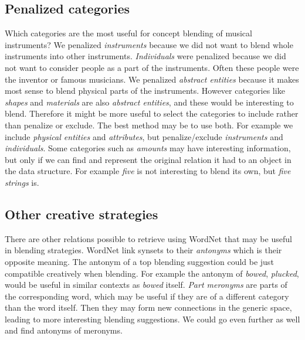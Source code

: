 
\subsection{Penalized categories}
Which categories are the most useful for concept blending of musical instruments? We penalized \emph{instruments} because we did not want to blend whole instruments into other instruments. \emph{Individuals} were penalized because we did not want to consider people as a part of the instruments. Often these people were the inventor or famous musicians. We penalized \emph{abstract entities} because it makes most sense to blend physical parts of the instruments. However categories like \emph{shapes} and \emph{materials} are also \emph{abstract entities}, and these would be interesting to blend. Therefore it might be more useful to select the categories to include rather than penalize or exclude. The best method may be to use both. For example we include \emph{physical entities} and \emph{attributes}, but penalize/exclude \emph{instruments} and \emph{individuals}. Some categories such as \emph{amounts} may have interesting information, but only if we can find and represent the original relation it had to an object in the data structure. For example \emph{five} is not interesting to blend its own, but \emph{five strings} is.


\subsection{Other creative strategies}
There are other relations possible to retrieve using WordNet that may be useful in blending strategies. WordNet link synsets to their \emph{antonyms} which is their opposite meaning. The antonym of a top blending suggestion could be just compatible creatively when blending. For example the antonym of \emph{bowed}, \emph{plucked}, would be useful in similar contexts as \emph{bowed} itself. \emph{Part meronyms} are parts of the corresponding word, which may be useful if they are of a different category than the word itself. Then they may form new connections in the generic space, leading to more interesting blending suggestions. We could go even further as well and find antonyms of meronyms.



